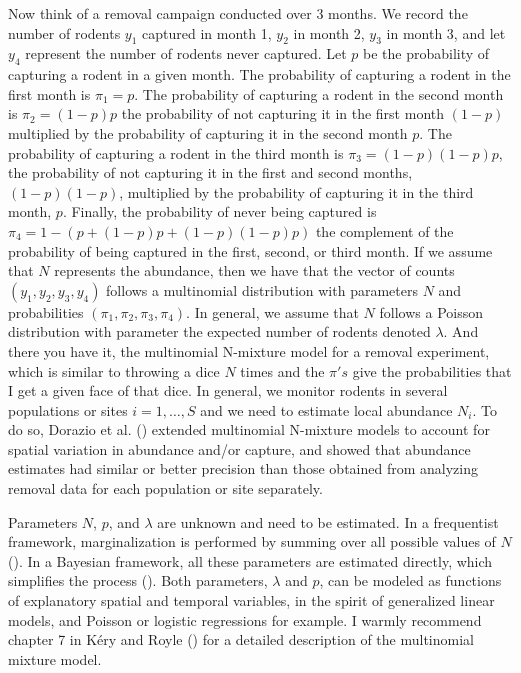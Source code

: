 \documentclass[
  11pt,
  a4paper,
]{article}
\begin{document}
Now think of a removal campaign conducted over 3 months. We record the number of rodents \(y_1\) captured in month 1, \(y_2\) in month 2, \(y_3\) in month 3, and let \(y_4\) represent the number of rodents never captured. Let \(p\) be the probability of capturing a rodent in a given month. The probability of capturing a rodent in the first month is \(\pi_1 = p\). The probability of capturing a rodent in the second month is \(\pi_2 = (1-p)p\) the probability of not capturing it in the first month \((1 - p)\) multiplied by the probability of capturing it in the second month \(p\). The probability of capturing a rodent in the third month is \(\pi_3 = (1-p)(1-p)p\), the probability of not capturing it in the first and second months, \((1 - p)(1 - p)\), multiplied by the probability of capturing it in the third month, \(p\). Finally, the probability of never being captured is \(\pi_4 = 1 - (p + (1-p)p + (1-p)(1-p)p)\) the complement of the probability of being captured in the first, second, or third month. If we assume that \(N\) represents the abundance, then we have that the vector of counts \((y_1, y_2, y_3, y_4)\) follows a multinomial distribution with parameters \(N\) and probabilities \((\pi_1,\pi_2,\pi_3,\pi_4)\). In general, we assume that \(N\) follows a Poisson distribution with parameter the expected number of rodents denoted \(\lambda\). And there you have it, the multinomial N-mixture model for a removal experiment, which is similar to throwing a dice \(N\) times and the \(\pi's\) give the probabilities that I get a given face of that dice. In general, we monitor rodents in several populations or sites \(i = 1,\ldots,S\) and we need to estimate local abundance \(N_i\). To do so, Dorazio et al. () extended multinomial N-mixture models to account for spatial variation in abundance and/or capture, and showed that abundance estimates had similar or better precision than those obtained from analyzing removal data for each population or site separately.

Parameters \(N\), \(p\), and \(\lambda\) are unknown and need to be estimated. In a frequentist framework, marginalization is performed by summing over all possible values of \(N\) (). In a Bayesian framework, all these parameters are estimated directly, which simplifies the process (). Both parameters, \(\lambda\) and \(p\), can be modeled as functions of explanatory spatial and temporal variables, in the spirit of generalized linear models, and Poisson or logistic regressions for example. I warmly recommend chapter 7 in Kéry and Royle () for a detailed description of the multinomial mixture model.
\end{document}
